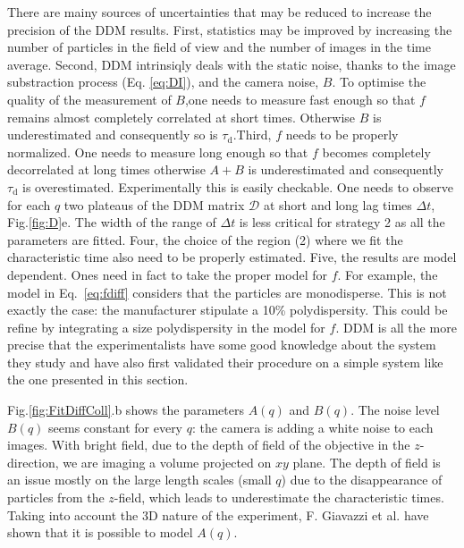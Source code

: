 \documentclass[prb,twocolumn,amsmath,amssymb]{revtex4-1}
\newcommand{\tgn}[1]{{\color{blue}#1}} %
\begin{document}
\tgn{There are mainy sources of uncertainties that may be reduced to increase the precision of the DDM results. First, statistics may be improved by increasing the number of particles in the field of view and the number of images in the time average. Second, DDM intrinsiqly deals with the static noise, thanks to the image substraction process (Eq. \ref{eq:DI}), and the camera noise, $B$. To optimise the quality of the  measurement of $B$,one needs to measure fast enough so that $f$ remains almost completely correlated at short times. Otherwise $B$ is underestimated and consequently so is $\tau_\text{d}$.Third, $f$ needs to be properly normalized.} One needs to measure long enough so that $f$ becomes completely decorrelated at long times otherwise $A+B$ is underestimated and consequently $\tau_\text{d}$ is overestimated. Experimentally this is easily checkable. One needs to observe for each $q$ two plateaus of the DDM matrix $\mathcal{D}$ at short and long lag times $\Delta t$, Fig.\ref{fig:D}e. The width of the range of $\Delta t$ is less critical for strategy 2 as all the parameters are fitted. Four, the choice of the region (2) where we fit the characteristic time also need to be properly estimated. Five, the results are model dependent. Ones need in fact to take the proper model for $f$. For example, the model in Eq.~\eqref{eq:fdiff}  considers that the particles are monodisperse. This is not exactly the case: the manufacturer stipulate a 10\% polydispersity. This could be refine by integrating a size polydispersity \tgn{in the model for $f$}. DDM is all the more precise that the experimentalists have some good knowledge about the system they study and have also first validated their procedure on a simple system like the one presented in this section.



 Fig.\ref{fig:FitDiffColl}.b shows the parameters $A(q)$ and $B(q)$. The noise level $B(q)$ seems constant for every $q$: the camera is adding a white noise to each images. With bright field, due to the depth of field of the objective in the $z$-direction, we are imaging a volume projected on $xy$ plane. The depth of field is an issue mostly on the large length scales (small $q$) due to the disappearance of particles from the $z$-field, which leads to underestimate the characteristic times\cite {4_Martinez20121637}. Taking into account the 3D nature of the experiment,  F. Giavazzi et al.\citep{3_DDM3D} have shown that it is possible to model $A(q)$.
\end{document}

